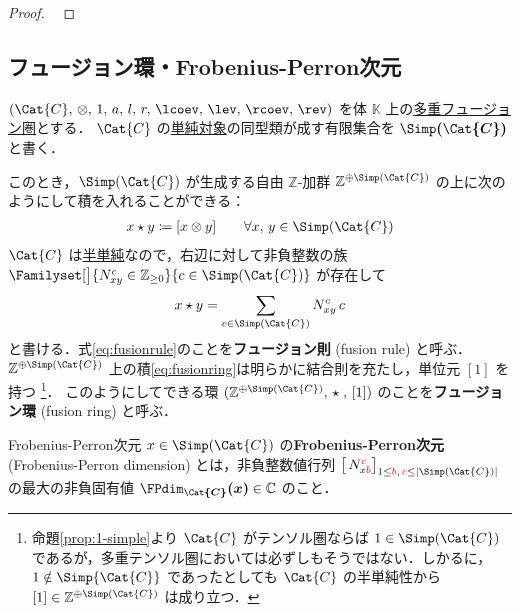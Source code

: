 \documentclass[TQFT_main]{subfiles}
\begin{document}
\begin{proof}
    ~\cite[THEOREM 4.7.15]{etingof2015tensor}
\end{proof}


\subsection{フュージョン環・Frobenius-Perron次元}

$(\Cat{C},\, \otimes,\, 1,\, a,\, l,\, r,\, \lcoev,\, \lev,\, \rcoev,\, \rev)$ を体 $\mathbb{K}$ 上の\hyperref[def:tensorfusion-cat]{多重フュージョン圏}とする．
$\Cat{C}$ の\hyperref[def:semisimple-cat]{単純対象}の同型類が成す有限集合を $\bm{\Simp (\Cat{C})}$ と書く．

このとき，$\Simp(\Cat{C})$ が生成する自由 $\mathbb{Z}$-加群 $\mathbb{Z}^{\oplus \Simp(\Cat{C})}$ の上に次のようにして積を入れることができる：
\begin{align}
    \label{eq:fusionring}
    x \star y \coloneqq [x \otimes y]\qquad \forall x,\, y \in \Simp(\Cat{C})
\end{align}
$\Cat{C}$ は\hyperref[def:semisimple-cat]{半単純}なので，右辺に対して非負整数の族 $\Familyset[\big]{N^c_{xy} \in \mathbb{Z}_{\ge 0}}{c \in \Simp(\Cat{C})}$ が存在して
\begin{align}
    \label{eq:fusionrule}
    x \star y = \sum_{c \in \Simp(\Cat{C})} N^c_{xy}\, c
\end{align}
と書ける．式\eqref{eq:fusionrule}のことを\textbf{フュージョン則} (fusion rule) と呼ぶ．
$\mathbb{Z}^{\oplus \Simp(\Cat{C})}$ 上の積\eqref{eq:fusionring}は明らかに結合則を充たし，単位元 $[1]$ を持つ
\footnote{命題\ref{prop:1-simple}より $\Cat{C}$ がテンソル圏ならば $1 \in \Simp(\Cat{C})$ であるが，多重テンソル圏においては必ずしもそうではない．しかるに，$1 \notin \Simp{\Cat{C}}$ であったとしても $\Cat{C}$ の半単純性から $[1] \in \mathbb{Z}^{\oplus \Simp(\Cat{C})}$ は成り立つ．}．
このようにしてできる環 $(\mathbb{Z}^{\oplus \Simp(\Cat{C})},\, \star\; ,\, [1])$ のことを\textbf{フュージョン環} (fusion ring) と呼ぶ．

\begin{mydef}[label=def:FPdim]{Frobenius-Perron次元}
    $x \in \Simp(\Cat{C})$ の\textbf{Frobenius-Perron次元} (Frobenius-Perron dimension) とは，非負整数値行列 $\bigl[\, N^{\textcolor{red}{c}}_{x \textcolor{red}{b}} \bigr]_{1 \le \textcolor{red}{b},\, \textcolor{red}{c} \le \abs{\Simp(\Cat{C})}}$ の最大の非負固有値 $\bm{\FPdim_{\Cat{C}} (x)} \in \mathbb{C}$ のこと．
\end{mydef}
\end{document}
